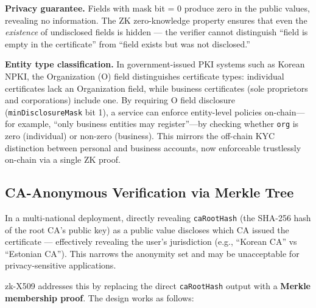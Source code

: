 \documentclass[11pt, a4paper]{article}
\begin{document}
\textbf{Privacy guarantee.} Fields with mask bit = 0 produce zero
in the public values, revealing no information. The ZK zero-knowledge
property ensures that even the \emph{existence} of undisclosed fields is
hidden --- the verifier cannot distinguish ``field is empty in the
certificate'' from ``field exists but was not disclosed.''

\textbf{Entity type classification.} In government-issued PKI systems
such as Korean NPKI, the Organization (O) field distinguishes certificate
types: individual certificates lack an Organization field, while business
certificates (sole proprietors and corporations) include one. By
requiring O field disclosure (\texttt{minDisclosureMask} bit 1), a
service can enforce entity-level policies on-chain---for example,
``only business entities may register''---by checking whether
\texttt{org} is zero (individual) or non-zero (business). This mirrors
the off-chain KYC distinction between personal and business accounts,
now enforceable trustlessly on-chain via a single ZK proof.

\subsection{CA-Anonymous Verification via Merkle
Tree}\label{ca-anonymous-verification-via-merkle-tree}

In a multi-national deployment, directly revealing \texttt{caRootHash}
(the SHA-256 hash of the root CA's public key) as a public value
discloses which CA issued the certificate --- effectively revealing the
user's jurisdiction (e.g., ``Korean CA'' vs ``Estonian CA''). This
narrows the anonymity set and may be unacceptable for privacy-sensitive
applications.

zk-X509 addresses this by replacing the direct \texttt{caRootHash}
output with a \textbf{Merkle membership proof}. The design works as
follows:
\end{document}
